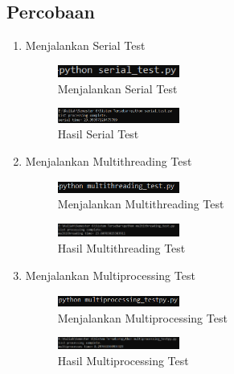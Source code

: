 \subsection{Percobaan}
\begin{enumerate}
	\item Menjalankan Serial Test
	\begin{figure}[H]
		\includegraphics[width=4cm]{figures/kelompok1/1/tomy/test1.PNG}
		\centering
		\caption{Menjalankan Serial Test}
	\end{figure}
	\begin{figure}[H]
		\includegraphics[width=4cm]{figures/kelompok1/1/tomy/hasil1.PNG}
		\centering
		\caption{Hasil Serial Test}
	\end{figure}
    \item Menjalankan Multithreading Test
	\begin{figure}[H]
		\includegraphics[width=4cm]{figures/kelompok1/1/tomy/test2.PNG}
		\centering
		\caption{Menjalankan Multithreading Test}
	\end{figure}
	\begin{figure}[H]
		\includegraphics[width=4cm]{figures/kelompok1/1/tomy/hasil2.PNG}
		\centering
		\caption{Hasil Multithreading Test}
	\end{figure}
    \item Menjalankan Multiprocessing Test
	\begin{figure}[H]
		\includegraphics[width=4cm]{figures/kelompok1/1/tomy/test3.PNG}
		\centering
		\caption{Menjalankan Multiprocessing Test}
	\end{figure}
	\begin{figure}[H]
		\includegraphics[width=4cm]{figures/kelompok1/1/tomy/hasil3.PNG}
		\centering
		\caption{Hasil Multiprocessing Test}
	\end{figure}
\end{enumerate}
